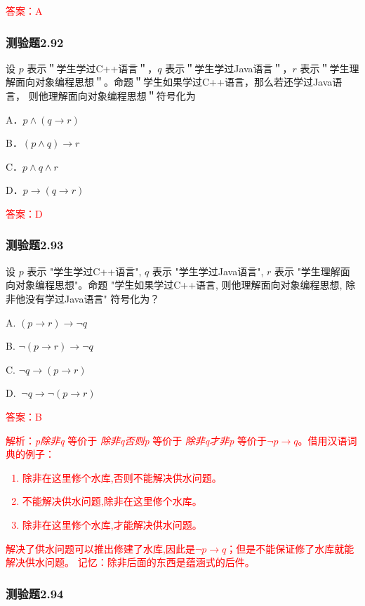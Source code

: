 \documentclass[UTF8, heading=true]{ctexart}
\begin{document}
\textcolor{red}{答案：A}  

\subsubsection{测验题2.92}

设 $p$ 表示＂学生学过C++语言＂，$q$ 表示＂学生学过Java语言＂，$r$ 
表示＂学生理解面向对象编程思想＂。命题＂学生如果学过C++语言，那么若还学过Java语言，
则他理解面向对象编程思想＂符号化为 $\qquad$

A．$
p \wedge(q \rightarrow r)
$


B．$
(p \wedge q) \rightarrow r
$


C．$
p \wedge q \wedge r
$


D．$
p \rightarrow(q \rightarrow r)
$

\textcolor{red}{答案：D}


\subsubsection{测验题2.93}

设 $p$ 表示 "学生学过C++语言", $q$ 表示 "学生学过Java语言", 
$r$ 表示 "学生理解面向对象编程思想"。命题 "学生如果学过C++语言, 
则他理解面向对象编程思想, 除非他没有学过Java语言" 符号化为？

A. $(p \rightarrow r) \rightarrow \neg q$

B. $\neg(p \rightarrow r) \rightarrow \neg q$

C. $\neg q \rightarrow(p \rightarrow r)$

D. $\ \neg q \rightarrow \neg(p \rightarrow r)$

\textcolor{red}{答案：B}

\textcolor{red}{解析：\textit{p除非q} 等价于 \textit{除非q否则p} 等价于 \textit{除非q才非p} 
等价于$\neg p\rightarrow q$。借用汉语词典的例子：
\begin{enumerate}
  \item \textcolor{red}{除非在这里修个水库,否则不能解决供水问题。}
  \item \textcolor{red}{不能解决供水问题,除非在这里修个水库。}
  \item \textcolor{red}{除非在这里修个水库,才能解决供水问题。}
\end{enumerate}
解决了供水问题可以推出修建了水库,因此是$\neg p\rightarrow q$；但是不能保证修了水库就能解决供水问题。
记忆：除非后面的东西是蕴涵式的后件。
}

\subsubsection{测验题2.94}
\end{document}

